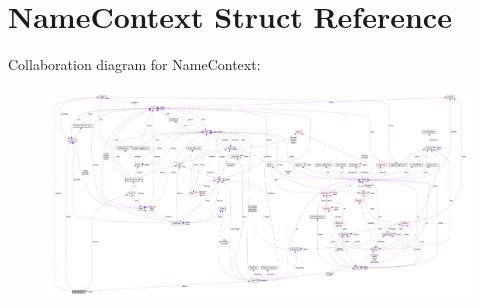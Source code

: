 \hypertarget{struct_name_context}{\section{Name\-Context Struct Reference}
\label{struct_name_context}
}


Collaboration diagram for Name\-Context\-:\nopagebreak
\begin{figure}[H]
\begin{center}
\leavevmode
\includegraphics[width=350pt]{struct_name_context__coll__graph}
\end{center}
\end{figure}
